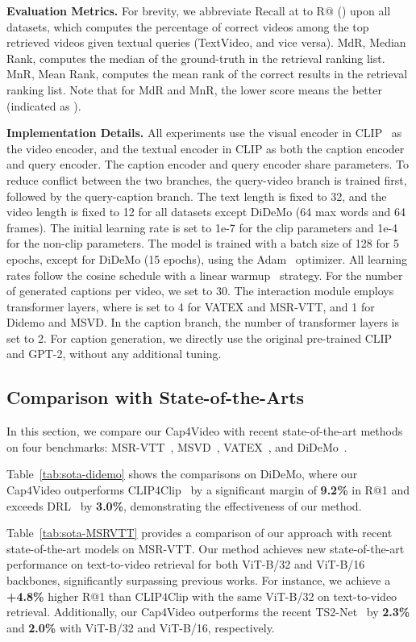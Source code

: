 \documentclass[10pt,twocolumn,letterpaper]{article}
\begin{document}
\noindent\textbf{Evaluation Metrics.} 
For brevity, we abbreviate Recall at  to R@ () upon all datasets, which computes the percentage of correct videos among the top  retrieved videos given textual queries (TextVideo, and vice versa). 
MdR, Median Rank, computes the median of the ground-truth in the retrieval ranking list. 
MnR, Mean Rank, computes the mean rank of the correct results in the retrieval ranking list. 
Note that for MdR and MnR, the lower score means the better (indicated as ).

\noindent\textbf{Implementation Details.} 
All experiments use the visual encoder in CLIP~\cite{clip} as the video encoder, and the textual encoder in CLIP as both the caption encoder and query encoder. The caption encoder and query encoder share parameters.
To reduce conflict between the two branches, the query-video branch is trained first, followed by the query-caption branch. The text length is fixed to 32, and the video length is fixed to 12 for all datasets except DiDeMo (64 max words and 64 frames).
The initial learning rate is set to 1e-7 for the clip parameters and 1e-4 for the non-clip parameters. The model is trained with a batch size of 128 for 5 epochs, except for DiDeMo (15 epochs), using the Adam~\cite{kingma2015adam} optimizer. All learning rates follow the cosine schedule with a linear warmup~\cite{goyal2017warmup} strategy. 
For the number of generated captions per video, we set  to 30. The interaction module employs  transformer layers, where  is set to 4 for VATEX and MSR-VTT, and 1 for Didemo and MSVD. In the caption branch, the number of transformer layers is set to 2.
For caption generation, we directly use the original pre-trained CLIP and GPT-2, without any additional tuning.


\subsection{Comparison with State-of-the-Arts}
In this section, we compare our Cap4Video with recent state-of-the-art methods on four benchmarks: MSR-VTT~\cite{xu2016msrvtt}, MSVD~\cite{wu2017msvd}, VATEX~\cite{wang2019vatex}, and DiDeMo~\cite{anne2017didemo}.

Table~\ref{tab:sota-didemo} shows the comparisons on DiDeMo, where our Cap4Video outperforms CLIP4Clip~\cite{luo2022clip4clip} by a significant margin of \textbf{9.2\%} in R@1 and exceeds DRL~\cite{wang2022disentangled} by \textbf{3.0\%}, demonstrating the effectiveness of our method.

Table~\ref{tab:sota-MSRVTT} provides a comparison of our approach with recent state-of-the-art models on MSR-VTT. Our method achieves new state-of-the-art performance on text-to-video retrieval for both ViT-B/32 and ViT-B/16 backbones, significantly surpassing previous works. For instance, we achieve a \textbf{+4.8\%} higher R@1 than CLIP4Clip with the same ViT-B/32 on text-to-video retrieval. Additionally, our Cap4Video outperforms the recent TS2-Net~\cite{liu2022ts2net} by \textbf{2.3\%} and \textbf{2.0\%} with ViT-B/32 and ViT-B/16, respectively.
\end{document}
